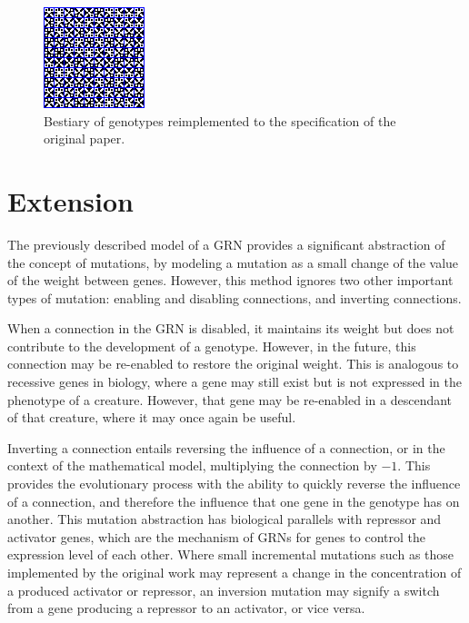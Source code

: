\documentclass[twocolumn,a4paper,11pt]{article}
\begin{document}
    \begin{figure}[h]
        \centering
        \includegraphics[width=0.7\linewidth]{img/fig4b.png}
        \caption{Bestiary of genotypes reimplemented to the specification of the original paper.} \label{fig:4b}
    \end{figure}

    \section{Extension}
    The previously described model of a GRN provides a significant abstraction of the concept of mutations, by modeling a mutation as a small change of the value of the weight between genes. However, this method ignores two other important types of mutation: enabling and disabling connections, and inverting connections.

    When a connection in the GRN is disabled, it maintains its weight but does not contribute to the development of a genotype. However, in the future, this connection may be re-enabled to restore the original weight. This is analogous to recessive genes in biology, where a gene may still exist but is not expressed in the phenotype of a creature. However, that gene may be re-enabled in a descendant of that creature, where it may once again be useful.
    
    Inverting a connection entails reversing the influence of a connection, or in the context of the mathematical model, multiplying the connection by $-1$. This provides the evolutionary process with the ability to quickly reverse the influence of a connection, and therefore the influence that one gene in the genotype has on another. This mutation abstraction has biological parallels with repressor and activator genes, which are the mechanism of GRNs for genes to control the expression level of each other. Where small incremental mutations such as those implemented by the original work may represent a change in the concentration of a produced activator or repressor, an inversion mutation may signify a switch from a gene producing a repressor to an activator, or vice versa.
\end{document}
